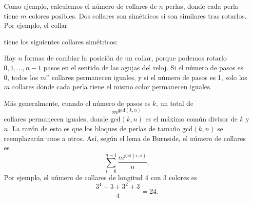 Como ejemplo, calculemos el número de
collares de $n$ perlas,
donde cada perla tiene $m$ colores posibles.
Dos collares son simétricos si son
similares tras rotarlos.
Por ejemplo, el collar
\begin{center}
\end{center}
tiene los siguientes collares simétricos:
\begin{center}
\end{center}
Hay $n$ formas de cambiar la posición
de un collar,
porque podemos rotarlo
$0,1,\ldots,n-1$ pasos en el sentido de las agujas del reloj.
Si el número de pasos es 0,
todos los $m^n$ collares permanecen iguales,
y si el número de pasos es 1,
solo los $m$ collares donde cada
perla tiene el mismo color permanecen iguales.

Más generalmente, cuando el número de pasos es $k$,
un total de
\[m^{\textrm{gcd}(k,n)}\]
collares permanecen iguales,
donde $\textrm{gcd}(k,n)$ es el máximo común
divisor de $k$ y $n$.
La razón de esto es que los bloques
de perlas de tamaño $\textrm{gcd}(k,n)$
se reemplazarán unos a otros.
Así, según el lema de Burnside,
el número de collares es
\[\sum_{i=0}^{n-1} \frac{m^{\textrm{gcd}(i,n)}}{n}. \]
Por ejemplo, el número de collares de longitud 4
con 3 colores es
\[\frac{3^4+3+3^2+3}{4} = 24. \]


